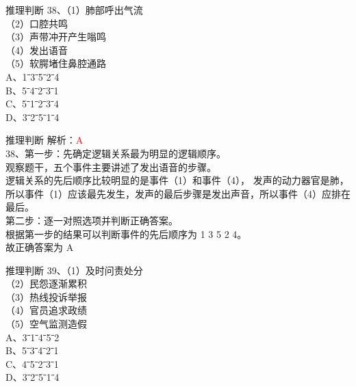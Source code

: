 \documentclass[aspectratio=169]{beamer}
\begin{document}
\begin{frame}[t]{推理判断}
    38、（1）肺部呼出气流\\
    （2）口腔共鸣\\
    （3）声带冲开产生嗡鸣\\
    （4）发出语音\\
    （5）软腭堵住鼻腔通路\\
    A、1ˉ3ˉ5ˉ2ˉ4\\
    B、5ˉ4ˉ2ˉ3ˉ1\\
    C、5ˉ1ˉ2ˉ3ˉ4\\
    D、3ˉ2ˉ5ˉ1ˉ4\\
\end{frame}


\begin{frame}[t]{推理判断}
    解析：\textcolor{red}{A}\\
    38、第一步：先确定逻辑关系最为明显的逻辑顺序。\\
    观察题干，五个事件主要讲述了发出语音的步骤。\\
    逻辑关系的先后顺序比较明显的是事件（1）和事件（4），
    发声的动力器官是肺，所以事件（1）应该最先发生，发声的最后步骤是发出声音，所以事件（4）应排在最后。\\
    第二步：逐一对照选项并判断正确答案。\\
    根据第一步的结果可以判断事件的先后顺序为 1 3 5 2 4。\\
    故正确答案为 A\\
\end{frame}


\begin{frame}[t]{推理判断}
    39、（1）及时问责处分\\
    （2）民怨逐渐累积\\
    （3）热线投诉举报\\
    （4）官员追求政绩\\
    （5）空气监测造假\\
    A、3ˉ1ˉ4ˉ5ˉ2\\
    B、5ˉ3ˉ4ˉ2ˉ1\\
    C、4ˉ5ˉ2ˉ3ˉ1\\
    D、3ˉ2ˉ5ˉ1ˉ4\\
\end{frame}
\end{document}
